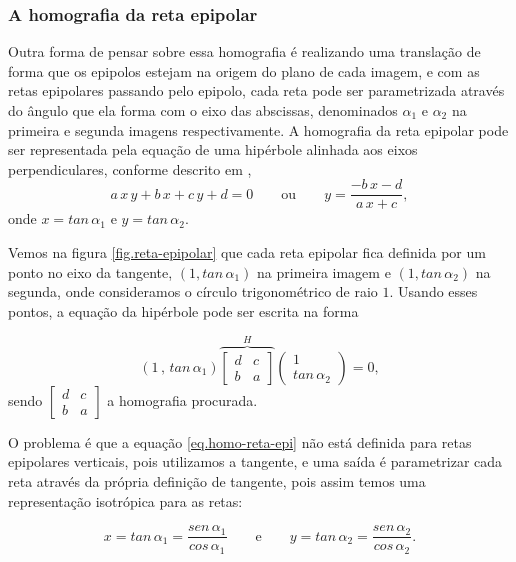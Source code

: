 \subsubsection{A homografia da reta epipolar} 


Outra forma de pensar sobre essa homografia é realizando uma translação de forma que os epipolos estejam na origem do plano de cada imagem, e com as retas epipolares passando pelo epipolo, cada reta pode ser parametrizada através do ângulo que ela forma com o eixo das abscissas, denominados $\alpha_1$ e $\alpha_2$ na primeira e segunda imagens respectivamente.
A homografia da reta epipolar pode ser representada pela equação de uma hipérbole alinhada aos eixos perpendiculares, conforme descrito em \cite{Fabbri:Kimia:CVPR10},
\begin{equation}\label{eq.hiperbole}
a\,x\,y+b\,x+c\,y+d=0 \qquad \text{ou} \qquad y=\frac{-b\,x-d}{a\,x+c},
\end{equation} 
onde $x=tan\,\alpha_1$ e $y=tan\,\alpha_2$. 

Vemos na figura \ref{fig.reta-epipolar} que cada reta epipolar fica definida por um ponto no eixo da tangente, $(1,tan\,\alpha_1)$ na primeira imagem e $(1,tan\,\alpha_2)$ na segunda, onde consideramos o círculo trigonométrico de raio $1$. Usando esses pontos, a equação da hipérbole pode ser escrita na forma

\begin{equation}\label{eq.homo-reta-epi}
(1\,,\,tan\,\alpha_1)
\overbrace{
\begin{bmatrix}
d&c\\
b&a
\end{bmatrix}
}^{H}
\begin{pmatrix}
1\\
tan\,\alpha_2
\end{pmatrix}
=0,
\end{equation}
sendo 
$\begin{bmatrix}d&c\\b&a\end{bmatrix}$ a homografia procurada.

O problema é que a equação \ref{eq.homo-reta-epi} não está definida para retas epipolares verticais, pois utilizamos a tangente, e uma saída é parametrizar cada reta através da própria definição de tangente, pois assim temos uma representação isotrópica para as retas:

\begin{equation}\label{eq.tan.alpha1-2}
x=tan\,\alpha_1=\frac{sen\,\alpha_1 }{cos\,\alpha_1} \qquad \text{e} \qquad y=tan\,\alpha_2=\frac{sen\,\alpha_2}{cos\,\alpha_2}.
\end{equation} 

